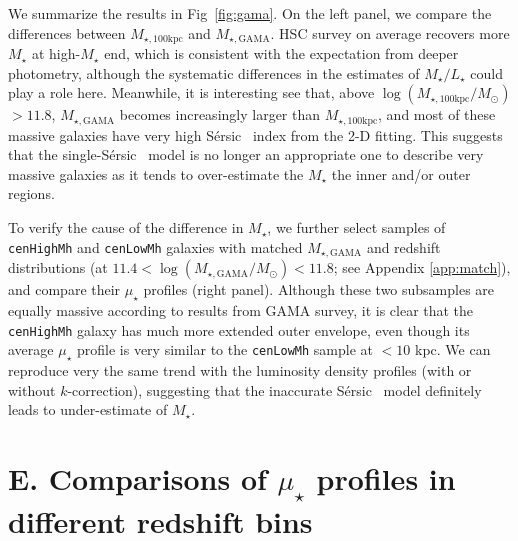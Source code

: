 \documentclass[a4paper,fleqn,usenatbib]{mnras}
\def\ser{{S\'{e}rsic\ }}
\def\rbcg{\texttt{cenHighMh}}
\def\nbcg{\texttt{cenLowMh}}
\def\mstar{{$M_{\star}$}}
\def\mtot{{$M_{\star,100\mathrm{kpc}}$}}
\def\mgama{{$M_{\star,\mathrm{GAMA}}$}}
\def\logmtot{{$\log (M_{\star,100\mathrm{kpc}}/M_{\odot})$}}
\def\logmgama{{$\log (M_{\star,\mathrm{GAMA}}/M_{\odot})$}}
\def\m2l{{$M_{\star}/L_{\star}$}}
\def\mden{{$\mu_{\star}$}}
\begin{document}
    We summarize the results in Fig~\ref{fig:gama}.  
    On the left panel, we compare the differences between \mtot{} and \mgama{}. 
    HSC survey on average recovers more \mstar{} at high-\mstar{} end, which is 
    consistent with the expectation from deeper photometry, although the 
    systematic differences in the estimates of \m2l{} could play a role here. 
    Meanwhile, it is interesting see that, above \logmtot{}$> 11.8$, \mgama{} 
    becomes increasingly larger than \mtot{}, and most of these massive 
    galaxies have very high \ser{} index from the 2-D fitting. 
    This suggests that the single-\ser{} model is no longer an appropriate one to 
    describe very massive galaxies as it tends to over-estimate the \mstar{} the 
    inner and/or outer regions. 
    
    To verify the cause of the difference in \mstar{}, we further select samples 
    of \rbcg{} and \nbcg{} galaxies with matched \mgama{} and redshift 
    distributions (at $11.4 <$\logmgama{}$<11.8$; see Appendix \ref{app:match}), 
    and compare their \mden{} profiles (right panel). 
    Although these two subsamples are equally massive according to results from 
    GAMA survey, it is clear that the \rbcg{} galaxy has much more extended 
    outer envelope, even though its average \mden{} profile is very similar 
    to the \nbcg{} sample at $< 10$ kpc. 
    We can reproduce very the same trend with the luminosity density profiles 
    (with or without $k$-correction), suggesting that the inaccurate \ser{} 
    model definitely leads to under-estimate of \mstar{}.  
 

\section{E. Comparisons of \mden{} profiles in different redshift bins}
    \label{app:redshift}
\end{document}
